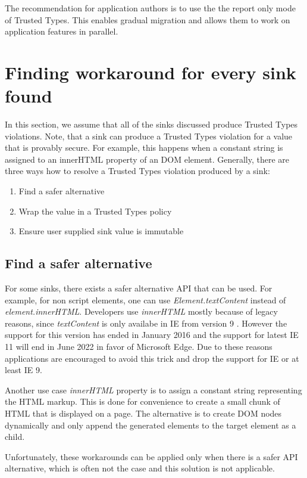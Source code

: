 The recommendation for application authors is to use the the report only mode of Trusted Types. This
enables gradual migration and allows them to work on application features in parallel.

\section{Finding workaround for every sink found}

In this section, we assume that all of the sinks discussed produce Trusted Types violations. Note,
that a sink can produce a Trusted Types violation for a value that is provably secure. For example,
this happens when a constant string is assigned to an innerHTML property of an DOM element.
Generally, there are three ways how to resolve a Trusted Types violation produced by a sink:

\begin{enumerate}
  \item Find a safer alternative
  \item Wrap the value in a Trusted Types policy
  \item Ensure user supplied sink value is immutable
\end{enumerate}

\subsection{Find a safer alternative}

For some sinks, there exists a safer alternative API that can be used. For example, for non script
elements, one can use \emph{Element.textContent} instead of \emph{element.innerHTML}. Developers use
\emph{innerHTML} mostly because of legacy reasons, since \emph{textContent} is only availabe in IE
from version 9 \cite{text_content_mdn}. However the support for this version has ended in January
2016 and the support for latest IE 11 will end in June 2022 in favor of Microsoft Edge. Due to these
reasons applications are encouraged to avoid this trick and drop the support for IE or at least IE
9.

Another use case \emph{innerHTML} property is to assign a constant string representing the HTML
markup. This is done for convenience to create a small chunk of HTML that is displayed on a page.
The alternative is to create DOM nodes dynamically and only append the generated elements to the
target element as a child.

Unfortunately, these workarounds can be applied only when there is a safer API alternative, which is
often not the case and this solution is not applicable.

